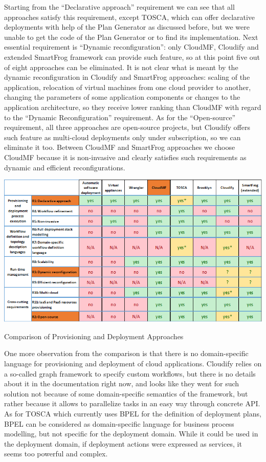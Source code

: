 \noindent

\noindent Starting from the ``Declarative approach'' requirement we can see that all approaches satisfy this requirement, except TOSCA, which can offer declarative deployments with help of the Plan Generator as discussed before, but we were unable to get the code of the Plan Generator or to find its implementation. Next essential requirement is ``Dynamic reconfiguration'': only CloudMF, Cloudify and extended SmartFrog framework can provide such feature, so at this point five out of eight approaches can be eliminated. It is not clear what is meant by the dynamic reconfiguration in Cloudify and SmartFrog approaches: scaling of the application, relocation of virtual machines from one cloud provider to another, changing the parameters of some application components or changes to the application architecture, so they receive lower ranking than CloudMF with regard to the ``Dynamic Reconfiguration'' requirement. As for the ``Open-source'' requirement, all three approaches are open-source projects, but Cloudify offers such feature as multi-cloud deployments only under subscription, so we can eliminate it too. Between CloudMF and SmartFrog approaches we choose CloudMF because it is non-invasive and clearly satisfies such requirements as dynamic and efficient reconfigurations.

\begin{center}
	\includegraphics[width=38em]{./Figures/Comparison}
	\begin{table}[htbp]
    \caption{Comparison of Provisioning and Deployment Approaches}
    \label{tab:1}
	\end{table}
\end{center}


\noindent One more observation from the comparison is that there is no domain-specific language for provisioning and deployment of cloud applications. Cloudify relies on a so-called graph framework to specify custom workflows, but there is no details about it in the documentation right now, and looks like they went for such solution not because of some domain-specific semantics of the framework, but rather because it allows to parallelize tasks in an easy way through concrete API. As for TOSCA which currently uses BPEL for the definition of deployment plans, BPEL can be considered as domain-specific language for business process modelling, but not specific for the deployment domain. While it could be used in the deployment domain, if deployment actions were expressed as services, it seems too powerful and complex.